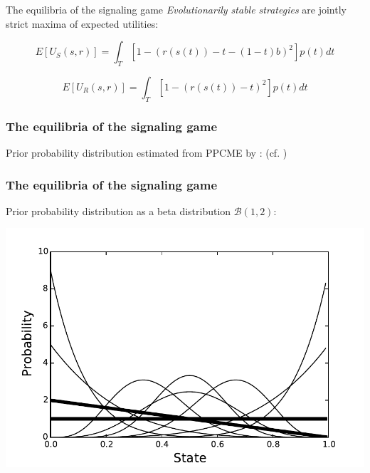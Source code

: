 \documentclass[compress]{beamer}
\begin{document}
\begin{frame}{The equilibria of the signaling game}
\emph{Evolutionarily stable strategies} are jointly strict maxima of expected utilities:
  \begin{center}
	\begin{equation}
	 E[U_S(s,r)] = \int_T [1 - (r(s(t)) - t - (1-t)b)^2]p(t)dt
	\end{equation}

	\begin{equation}
	 E[U_R(s,r)] = \int_T [1 - (r(s(t)) - t)^2	]p(t)dt
	\end{equation}
  \end{center}
  \vfill \hfill  \citep{selten:1980}
\end{frame}


\begin{frame}
\frametitle{The equilibria of the signaling game}
Prior probability distribution estimated from PPCME \citep{ppcme2} by \citet{wallage2013}:
\vfill
{}
\vfill \hfill (cf. \cite{tottie:1991,thompson1998})
\end{frame}


\begin{frame}
\frametitle{The equilibria of the signaling game}
Prior probability distribution as a beta distribution $\mathcal{B}(1,2)$:
	\begin{center}
		\includegraphics[width=.75\textwidth]{beta-distribution.pdf}
	\end{center}
\end{frame}
\end{document}
